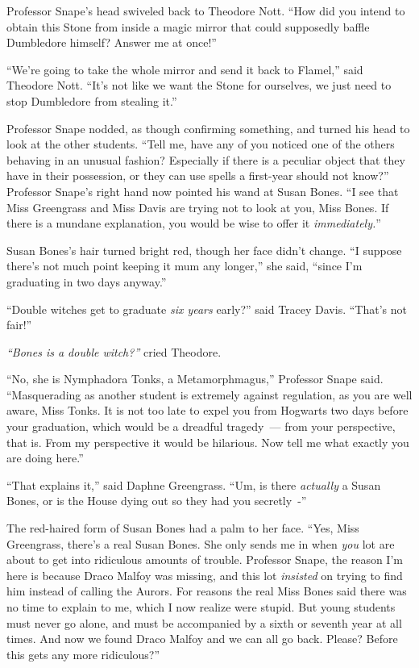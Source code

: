 Professor Snape's head swiveled back to Theodore Nott. ``How did you intend to obtain this Stone from inside a magic mirror that could supposedly baffle Dumbledore himself? Answer me at once!''

``We're going to take the whole mirror and send it back to Flamel,'' said Theodore Nott. ``It's not like we want the Stone for ourselves, we just need to stop Dumbledore from stealing it.''

Professor Snape nodded, as though confirming something, and turned his head to look at the other students. ``Tell me, have any of you noticed one of the others behaving in an unusual fashion? Especially if there is a peculiar object that they have in their possession, or they can use spells a first-year should not know?'' Professor Snape's right hand now pointed his wand at Susan Bones. ``I see that Miss Greengrass and Miss Davis are trying not to look at you, Miss Bones. If there is a mundane explanation, you would be wise to offer it \emph{immediately.}''

Susan Bones's hair turned bright red, though her face didn't change. ``I suppose there's not much point keeping it mum any longer,'' she said, ``since I'm graduating in two days anyway.''

``Double witches get to graduate \emph{six years} early?'' said Tracey Davis. ``That's not fair!''

\emph{``Bones is a double witch?''} cried Theodore.

``No, she is Nymphadora Tonks, a Metamorphmagus,'' Professor Snape said. ``Masquerading as another student is extremely against regulation, as you are well aware, Miss Tonks. It is not too late to expel you from Hogwarts two days before your graduation, which would be a dreadful tragedy~--- from your perspective, that is. From my perspective it would be hilarious. Now tell me what exactly you are doing here.''

``That explains it,'' said Daphne Greengrass. ``Um, is there \emph{actually} a Susan Bones, or is the House dying out so they had you secretly~-''

The red-haired form of Susan Bones had a palm to her face. ``Yes, Miss Greengrass, there's a real Susan Bones. She only sends me in when \emph{you} lot are about to get into ridiculous amounts of trouble. Professor Snape, the reason I'm here is because Draco Malfoy was missing, and this lot \emph{insisted} on trying to find him instead of calling the Aurors. For reasons the real Miss Bones said there was no time to explain to me, which I now realize were stupid. But young students must never go alone, and must be accompanied by a sixth or seventh year at all times. And now we found Draco Malfoy and we can all go back. Please? Before this gets any more ridiculous?''


